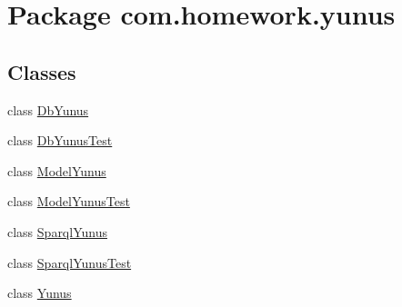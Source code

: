\hypertarget{namespacecom_1_1homework_1_1yunus}{}\section{Package com.\+homework.\+yunus}
\label{namespacecom_1_1homework_1_1yunus}
\subsection*{Classes}
\begin{DoxyCompactItemize}
\item 
class \hyperlink{classcom_1_1homework_1_1yunus_1_1_db_yunus}{Db\+Yunus}
\item 
class \hyperlink{classcom_1_1homework_1_1yunus_1_1_db_yunus_test}{Db\+Yunus\+Test}
\item 
class \hyperlink{classcom_1_1homework_1_1yunus_1_1_model_yunus}{Model\+Yunus}
\item 
class \hyperlink{classcom_1_1homework_1_1yunus_1_1_model_yunus_test}{Model\+Yunus\+Test}
\item 
class \hyperlink{classcom_1_1homework_1_1yunus_1_1_sparql_yunus}{Sparql\+Yunus}
\item 
class \hyperlink{classcom_1_1homework_1_1yunus_1_1_sparql_yunus_test}{Sparql\+Yunus\+Test}
\item 
class \hyperlink{classcom_1_1homework_1_1yunus_1_1_yunus}{Yunus}
\end{DoxyCompactItemize}
